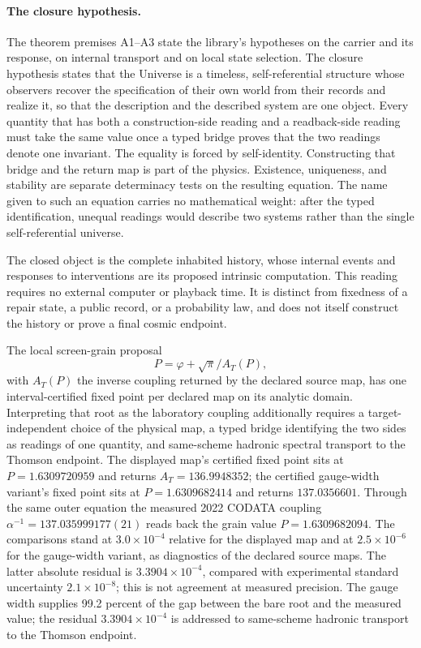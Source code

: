 
\paragraph{The closure hypothesis.}
The theorem premises A1--A3 state the library's hypotheses on the carrier and
its response, on internal transport and on local state selection. The closure hypothesis
states that the Universe is a timeless, self-referential structure whose
observers recover the specification of their own world from their records
and realize it, so that the description and the described system are one
object. Every quantity that
has both a construction-side reading and a readback-side reading must take
the same value once a typed bridge proves that the two readings denote one
invariant. The equality is forced by self-identity. Constructing that bridge
and the return map is part of the physics. Existence, uniqueness, and
stability are separate determinacy tests on the resulting equation. The name
given to such an equation carries no mathematical weight: after the typed
identification, unequal readings would describe two systems rather than the
single self-referential universe.

The closed object is the complete inhabited history, whose internal events
and responses to interventions are its proposed intrinsic computation.
This reading requires no external computer or playback time. It is distinct
from fixedness of a repair state, a public record, or a probability law, and
does not itself construct the history or prove a final cosmic endpoint.

The local screen-grain proposal
\[
P=\varphi+\sqrt{\pi}/A_T(P),
\]
with \(A_T(P)\) the inverse coupling returned by the declared source map,
has one interval-certified fixed point per declared map on its analytic domain.
Interpreting that root as the laboratory coupling additionally requires a
target-independent choice of the physical map, a typed bridge identifying
the two sides as readings of one quantity, and same-scheme hadronic spectral
transport to the Thomson endpoint.
The displayed map's certified fixed point sits at $P=1.6309720959$ and
returns $A_T=136.9948352$; the certified gauge-width variant's fixed
point sits at $P=1.6309682414$ and returns $137.0356601$. Through the
same outer equation the measured 2022 CODATA coupling
$\alpha^{-1}=137.035999177(21)$ reads back the grain value
$P=1.6309682094$. The comparisons stand at $3.0\times10^{-4}$ relative
for the displayed map and at $2.5\times10^{-6}$ for the gauge-width
variant, as diagnostics of the declared source maps. The latter absolute
residual is $3.3904\times10^{-4}$, compared with experimental standard
uncertainty $2.1\times10^{-8}$; this is not agreement at measured precision.
The gauge width supplies 99.2 percent of the gap between the bare root and the
measured value; the residual $3.3904\times10^{-4}$ is addressed to same-scheme
hadronic transport to the Thomson endpoint.

